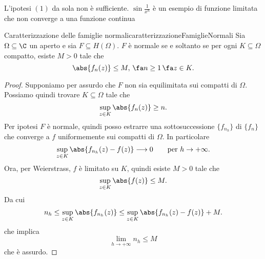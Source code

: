 \begin{oss}
	L'ipotesi \((1)\) da sola non è sufficiente. \(\sin \frac{1}{x^n}\) è un esempio di funzione limitata che non converge a una funzione continua
\end{oss}

\begin{teor}{Caratterizzazione delle famiglie normali}{caratterizzazioneFamiglieNormali}
	Sia \(\Omega\subseteq\C\) un aperto e sia \(F\subseteq H(\Omega)\).
	\(F\) è normale se e soltanto se per ogni \(K\subseteq\Omega\) compatto, esiste \(M>0\) tale che
	\[
		\abs{f_n(z)} \le M,\,\fa n\ge 1\,\fa z\in K.
	\]
\end{teor}

\begin{proof}
	\graffito{\(\Rightarrow)\)}Supponiamo per assurdo che \(F\) non sia equilimitata sui compatti di \(\Omega\). Possiamo quindi trovare \(K\subseteq\Omega\) tale che
	\[
		\sup_{z\in K}\abs{f_n(z)} \ge n.
	\]
	Per ipotesi \(F\) è normale, quindi posso estrarre una sottosuccessione \(\{f_{n_h}\}\) di \(\{f_n\}\) che converge a \(f\) uniformemente sui compatti di \(\Omega\). In particolare
	\[
		\sup_{z\in K} \abs{f_{n_h}(z)-f(z)} \longrightarrow 0 \qquad\text{per }h \to +\infty.
	\]
	Ora, per Weierstrass, \(f\) è limitato su \(K\), quindi esiste \(M>0\) tale che
	\[
		\sup_{z\in K} \abs{f(z)} \le M.
	\]
	Da cui
	\[
		n_h \le \sup_{z\in K}\abs{f_{n_h}(z)} \le \sup_{z\in K} \abs{f_{n_h}(z)-f(z)} + M.
	\]
	che implica
	\[
		\lim_{h \to +\infty} n_h \le M
	\]
	che è assurdo.
	

\end{proof}
